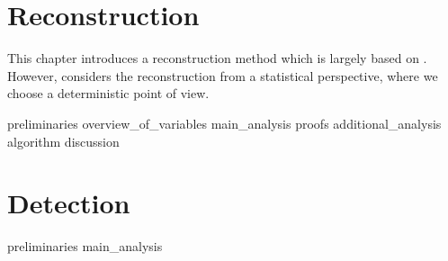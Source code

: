 \documentclass[a4paper, openany, oneside]{memoir}
\begin{document}
\chapter{Reconstruction}
This chapter introduces a reconstruction method which is largely based on \cite{ariananda2012compressive}. However, \cite{ariananda2012compressive} considers the reconstruction from a statistical perspective, where we choose a deterministic point of view.

{preliminaries}
{overview_of_variables}
{main_analysis}
{proofs}
{additional_analysis}
{algorithm}
{discussion}


\chapter{Detection}

{preliminaries}
{main_analysis}
\end{document}
